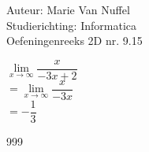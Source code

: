 \documentclass[a4paper]{article}
\begin{document}
  
\noindent \large Auteur: Marie Van Nuffel\\
\noindent \large Studierichting: Informatica\\
\noindent \large Oefeningenreeks 2D nr. 9.15\\

\medskip

\normalsize

$ \lim\limits_{x\to\infty} \dfrac{x}{-3x+2} $\\

$= \lim\limits_{x\to\infty}\dfrac{x}{-3x}$\\

$=-\dfrac{1}{3}$\\


\begin{thebibliography}{999}
\end{thebibliography}
\end{document}
